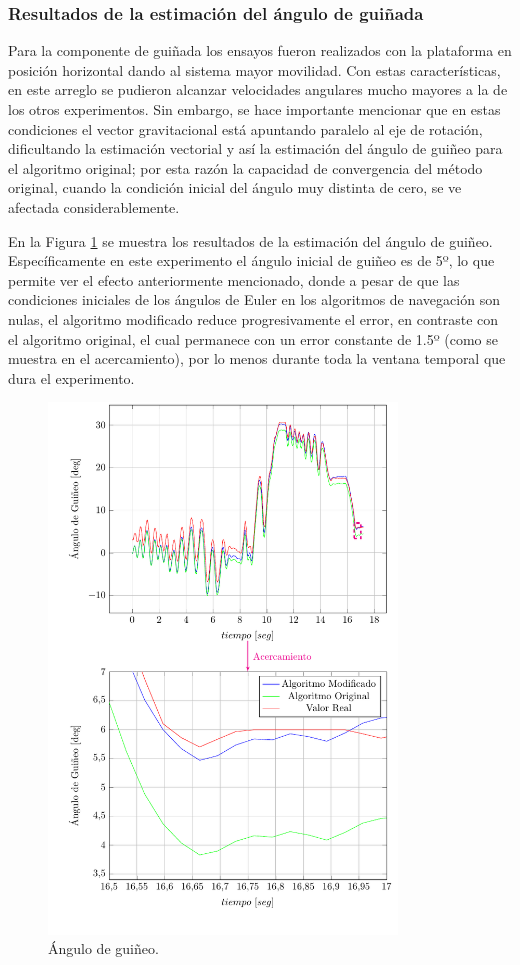 \documentclass[conference]{IEEEtran}
\begin{document}
\subsubsection{Resultados de la estimación del ángulo de guiñada}
Para la componente de guiñada los ensayos fueron realizados con la plataforma en posición horizontal dando al sistema mayor movilidad. Con estas características, en este arreglo se pudieron alcanzar velocidades angulares mucho mayores a la de los otros experimentos. Sin embargo, se hace importante mencionar que en estas condiciones el vector gravitacional está apuntando paralelo al eje de rotación, dificultando la estimación vectorial y así la estimación del ángulo de guiñeo para el algoritmo original; por esta razón la capacidad de convergencia del método original, cuando la condición inicial del ángulo muy distinta de cero, se ve afectada considerablemente.\par
En la Figura \ref{PlotPs1} se muestra los resultados de la estimación del ángulo de guiñeo. Específicamente en este experimento el ángulo inicial de guiñeo es de 5º, lo que permite ver el efecto anteriormente mencionado, donde a pesar de que las condiciones iniciales de los ángulos de Euler en los algoritmos de navegación son nulas, el algoritmo modificado reduce progresivamente el error, en contraste con el algoritmo original, el cual permanece con un error constante de 1.5º (como se muestra en el acercamiento), por lo menos durante toda la ventana temporal que dura el experimento.\par
\begin{figure}
\begin{center}
\includegraphics[width=25em]{PlotPs11.pdf}
\caption{Ángulo de guiñeo.}
\label{PlotPs1}
\end{center}
\end{figure}
\end{document}
